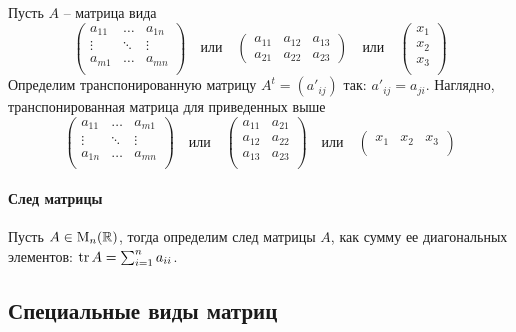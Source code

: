 Пусть $A$ -- матрица вида
\[
\begin{pmatrix}
{a_{11}}&{\ldots}&{a_{1n}}\\
{\vdots}&{\ddots}&{\vdots}\\
{a_{m1}}&{\ldots}&{a_{mn}}\\
\end{pmatrix}\quad \text{или}\quad
\begin{pmatrix}
{a_{11}}&{a_{12}}&{a_{13}}\\
{a_{21}}&{a_{22}}&{a_{23}}
\end{pmatrix}\quad \text{или}\quad
\begin{pmatrix}
{x_1}\\
{x_2}\\
{x_3}\\
\end{pmatrix}
\]
Определим транспонированную матрицу $A^t = (a'_{ij})$ так: $a'_{ij} = a_{ji}$.
Наглядно, транспонированная матрица для приведенных выше
\[
\begin{pmatrix}
{a_{11}}&{\ldots}&{a_{m1}}\\
{\vdots}&{\ddots}&{\vdots}\\
{a_{1n}}&{\ldots}&{a_{mn}}\\
\end{pmatrix}\quad\text{или}\quad
\begin{pmatrix}
{a_{11}}&{a_{21}}\\
{a_{12}}&{a_{22}}\\
{a_{13}}&{a_{23}}\\
\end{pmatrix}\quad \text{или}\quad
\begin{pmatrix}
{x_1}&{x_2}&{x_3}\\
\end{pmatrix}
\]

\paragraph{След матрицы}

Пусть $A\in\operatorname{M}_{n}(\mathbb R)$, тогда определим след матрицы $A$, как сумму ее диагональных элементов: $\operatorname{tr} A = \sum_{i=1}^n a_{ii}$.


\subsection{Специальные виды матриц}

